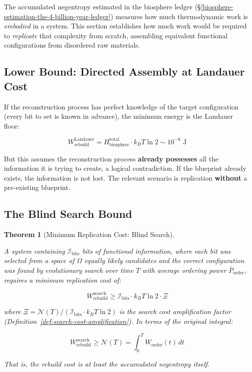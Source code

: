 \documentclass[11pt]{article}
\theoremstyle{plain}
\newtheorem{theorem}{Theorem}
\theoremstyle{definition}
\theoremstyle{remark}
\let\origsubsection\subsection
\renewcommand{\subsection}{\needspace{7\baselineskip}\origsubsection}
\begin{document}
The accumulated negentropy estimated in the biosphere ledger
(§\ref{biosphere-estimation-the-4-billion-year-ledger}) measures how
much thermodynamic work is \emph{embodied} in a system. This section
establishes how much work would be required to \emph{replicate} that
complexity from scratch, assembling equivalent functional configurations
from disordered raw materials.

\subsection{Lower Bound: Directed Assembly at Landauer
Cost}\label{lower-bound-directed-assembly-at-landauer-cost}

If the reconstruction process has perfect knowledge of the target
configuration (every bit to set is known in advance), the minimum energy
is the Landauer floor:

\[W_{\text{rebuild}}^{\text{Landauer}} = H_{\text{biosphere}}^{\text{total}} \cdot k_B T \ln 2 \sim 10^{-6} \text{ J}\]

But this assumes the reconstruction process \textbf{already possesses}
all the information it is trying to create, a logical contradiction. If
the blueprint already exists, the information is not lost. The relevant
scenario is replication \textbf{without} a pre-existing blueprint.

\subsection{The Blind Search Bound}\label{the-blind-search-bound}

\begin{theorem}[Minimum Replication Cost: Blind Search]
\label{thm-minimum-replication-cost}

A system containing $\mathcal{I}_{\text{bits}}$ bits of functional information, where each bit was selected from a space of $\Omega$ equally likely candidates and the correct configuration was found by evolutionary search over time $T$ with average ordering power $\bar{P}_{\text{order}}$, requires a minimum replication cost of:

$$W_{\text{rebuild}}^{\text{search}} \geq \mathcal{I}_{\text{bits}} \cdot k_B T \ln 2 \cdot \Xi$$

where $\Xi = \mathcal{N}(T) / ({\mathcal{I}_{\text{bits}} \cdot k_B T \ln 2})$ is the search cost amplification factor (Definition~\ref{def-search-cost-amplification}). In terms of the original integral:

$$W_{\text{rebuild}}^{\text{search}} \geq \mathcal{N}(T) = \int_0^T \dot{W}_{\text{order}}(t) \, dt$$

That is, the rebuild cost is at least the accumulated negentropy itself.
\end{theorem}
\end{document}
